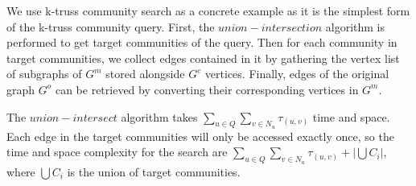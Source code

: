 We use k-truss community search as a concrete example as it is the simplest form of the \bottomlevelprob{} k-truss community query. First, the $union-intersection$ algorithm is performed to get target communities of the query. Then for each community in target communities, we collect edges contained in it by gathering the vertex list of subgraphs of $G^m$ stored alongside $G^c$ vertices. Finally, edges of the original graph $G^o$ can be retrieved by converting their corresponding vertices in $G^m$. 


The $union-intersect$ algorithm takes $\sum_{u \in Q}{\sum_{v \in N_u}{\tau_{(u,v)}}}$ time and space. Each edge in the target communities will only be accessed exactly once, so the time and space complexity for the search are $\sum_{u \in Q}{\sum_{v \in N_u}{\tau_{(u,v)}}} + |\bigcup{C_i}|$, where $\bigcup{C_i}$ is the union of target communities.


